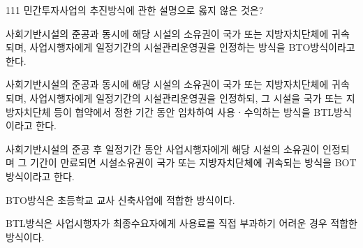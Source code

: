 \begin{question}{111}
민간투자사업의 추진방식에 관한 설명으로 옳지 않은 것은?
\begin{choices}
  \item 사회기반시설의 준공과 동시에 해당 시설의 소유권이 국가 또는 지방자치단체에 귀속되며, 사업시행자에게 일정기간의 시설관리운영권을 인정하는 방식을 BTO방식이라고 한다.
  \item 사회기반시설의 준공과 동시에 해당 시설의 소유권이 국가 또는 지방자치단체에 귀속되며, 사업시행자에게 일정기간의 시설관리운영권을 인정하되, 그 시설을 국가 또는 지방자치단체 등이 협약에서 정한 기간 동안 임차하여 사용ㆍ수익하는 방식을 BTL방식이라고 한다.
  \item 사회기반시설의 준공 후 일정기간 동안 사업시행자에게 해당 시설의 소유권이 인정되며 그 기간이 만료되면 시설소유권이 국가 또는 지방자치단체에 귀속되는 방식을 BOT방식이라고 한다.
  \item BTO방식은 초등학교 교사 신축사업에 적합한 방식이다.
  \item BTL방식은 사업시행자가 최종수요자에게 사용료를 직접 부과하기 어려운 경우 적합한 방식이다.
\end{choices}
\end{question}

